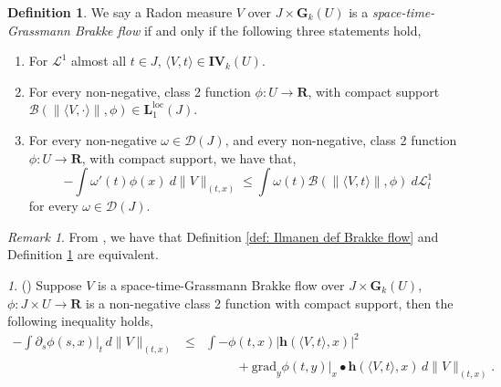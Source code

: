 \documentclass{article}
\theoremstyle{plain}
\theoremstyle{definition}
\newtheorem{definition}[theorem]{Definition}
\theoremstyle{plain}
\theoremstyle{remark}
\newtheorem{propparagraph}[theorem]{}
\theoremstyle{remark}
\newtheorem{remark}[theorem]{Remark}
\theoremstyle{plain}
\begin{document}
\begin{definition}\label{def: space-time-Grassmann Brakke flow}
    We say a Radon measure $V$ over $J \times \mathbf{G}_{k} (U)$ is a \textit{space-time-Grassmann Brakke flow} if and only if the  following three statements hold,
    \begin{enumerate}
        \item For $\mathscr{L}^{1}$ almost all $t \in J$, $\langle V, t \rangle \in \mathbf{IV}_{k} (U)$.
        \item For every non-negative, class 2 function $\phi \colon U \rightarrow \mathbf{R}$, with compact support $\mathscr B(\|\langle V,\cdot\rangle \|,\phi) \in \mathbf{L}_{1}^{\text{loc}} (J)$.
        \item For every non-negative $\omega \in \mathscr{D} (J)$, and every non-negative, class 2 function $\phi \colon U \rightarrow \mathbf{R}$, with compact support, we have that, 
    \begin{equation*}
        - \textstyle \int \omega'(t) \phi(x) \ d \|V\|_{(t,x)} 
        \leq \textstyle \int \omega(t) \mathscr B(\|\langle V,t\rangle \|,\phi) \ d \mathscr L^1_t
    \end{equation*}
    for every $\omega \in \mathscr D(J)$.
    \end{enumerate}
\end{definition}

\begin{remark}
    From \cite[4.12]{LW-Space-Time-GrassmannMeasureBrakkeFlow}, we have that Definition \ref{def: Ilmanen def Brakke flow} and Definition \ref{def: space-time-Grassmann Brakke flow} are equivalent.
\end{remark}

\begin{propparagraph}\label{proppara: extended Brakke inequality}
    (\cite[4.13]{LW-Space-Time-GrassmannMeasureBrakkeFlow})
    Suppose $V$ is a space-time-Grassmann Brakke flow over $J \times \mathbf{G}_{k} (U)$, $\phi \colon J \times U \rightarrow \mathbf{R}$ is a non-negative class 2 function with compact support, then the following inequality holds, 
    \begin{eqnarray*}
        - \textstyle \int \partial_{s} \phi (s, x)|_{t} \, d \| V \|_{(t, x)} &\leq& \textstyle\int - \phi(t, x) |\mathbf{h} (\langle V, t \rangle, x)|^{2} \\ 
        && \hspace{1cm} + \mathrm{grad}_{y} \phi (t, y)|_{x} \bullet \mathbf{h} (\langle V, t \rangle, x) \, d \| V \|_{(t, x)}.
    \end{eqnarray*}
\end{propparagraph}
\end{document}
